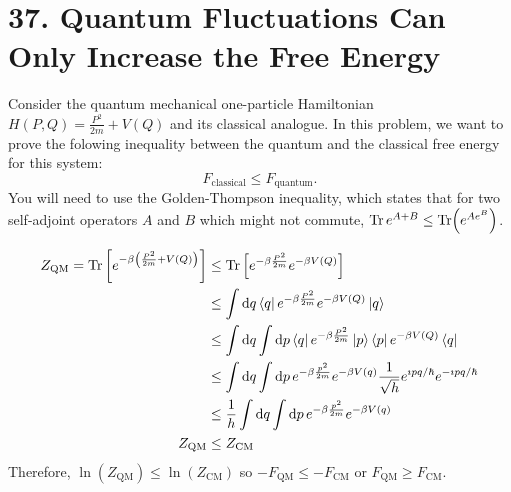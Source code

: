\documentclass[a4paper,twoside]{article}
\begin{document}
\section*{37. Quantum Fluctuations Can Only Increase the Free Energy}
Consider the quantum mechanical one-particle Hamiltonian $ H(P,Q) = \frac{P^2}{2m} + V(Q) $ and its classical analogue. In this problem, we want to prove the folowing inequality between the quantum and the classical free energy for this system:
\begin{equation}
    F_{\text{classical}} \leq F_{\text{quantum}}.
\end{equation}
You will need to use the Golden-Thompson inequality, which states that for two self-adjoint operators $ A $ and $ B $ which might not commute, $ \Tr e^{A+B} \leq \Tr(e^{A e^{B}}) $. 
\begin{problem}
    \begin{align}
        Z_{\text{QM}} = \Tr \left[ e^{- \beta \left( \frac{P^2}{2m} + V(Q) \right)} \right] &\leq \Tr \left[ e^{- \beta \frac{P^2}{2m}} e^{- \beta V(Q)} \right] \\
        &\leq \int \dd{q}\bra{q} e^{- \beta \frac{P^2}{2m}} e^{- \beta V(Q)}\ket{q} \\
        &\leq \int \dd{q} \int \dd{p}\bra{q} e^{- \beta \frac{P^2}{2m}}\ket{p}\bra{p} e^{- \beta V(Q)}\bra{q} \\
        &\leq \int \dd{q} \int \dd{p} e^{- \beta \frac{p^2}{2m}} e^{- \beta V(q)} \frac{1}{\sqrt{h}} e^{\imath pq / \hbar} e^{- \imath pq / \hbar} \\
        &\leq \frac{1}{h} \int \dd{q} \int \dd{p} e^{- \beta \frac{p^2}{2m}} e^{- \beta V(q)} \\
        Z_{\text{QM}} &\leq Z_{\text{CM}}
    \end{align}
    Therefore, $ \ln(Z_{\text{QM}}) \leq \ln(Z_{\text{CM}}) $ so $ - F_{\text{QM}} \leq - F_{\text{CM}} $ or $ F_{\text{QM}} \geq F_{\text{CM}} $.
\end{problem}
\end{document}
